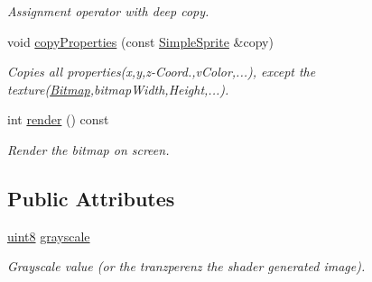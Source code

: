\begin{DoxyCompactItemize}
\begin{DoxyCompactList}\small\item\em Assignment operator with deep copy. \item\end{DoxyCompactList}\item 
void \hyperlink{class_f2_c_1_1_simple_sprite_a1aa8944250c186b4a88c7bf7850fbb67}{copyProperties} (const \hyperlink{class_f2_c_1_1_simple_sprite}{SimpleSprite} \&copy)
\begin{DoxyCompactList}\small\item\em Copies all properties(x,y,z-\/Coord.,vColor,...), except the texture(\hyperlink{class_f2_c_1_1_bitmap}{Bitmap},bitmapWidth,Height,...). \item\end{DoxyCompactList}\item 
int \hyperlink{class_f2_c_1_1_simple_sprite_a94d58e6e46796a7352486817d51a1c3f}{render} () const 
\begin{DoxyCompactList}\small\item\em Render the bitmap on screen. \item\end{DoxyCompactList}\end{DoxyCompactItemize}
\subsection*{Public Attributes}
\begin{DoxyCompactItemize}
\item 
\hypertarget{class_f2_c_1_1_simple_sprite_a72871a4bdff954844ebe4243aa859e13}{
\hyperlink{namespace_f2_c_a711deb33697d145669b9c0c4fe87c7ca}{uint8} \hyperlink{class_f2_c_1_1_simple_sprite_a72871a4bdff954844ebe4243aa859e13}{grayscale}}
\label{class_f2_c_1_1_simple_sprite_a72871a4bdff954844ebe4243aa859e13}

\begin{DoxyCompactList}\small\item\em Grayscale value (or the tranzperenz the shader generated image). \item\end{DoxyCompactList}\end{DoxyCompactItemize}

